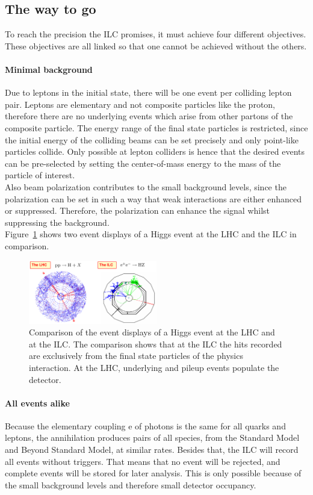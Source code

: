 \subsection{The way to go}
To reach the precision the ILC promises, it must achieve four different objectives.
These objectives are all linked so that one cannot be achieved without the others.

\paragraph{Minimal background}
Due to leptons in the initial state, there will be one event per colliding lepton pair.
Leptons are elementary and not composite particles like the proton, therefore there are no underlying events which arise from other partons of the composite particle.
The energy range of the final state particles is restricted, since the initial energy of the colliding beams can be set precisely and only point-like particles collide.
Only possible at lepton colliders is hence that the desired events can be pre-selected by setting the center-of-mass energy to the mass of the particle of interest.\\
Also beam polarization contributes to the small background levels, since the polarization can be set in such a way that weak interactions are either enhanced or suppressed.
Therefore, the polarization can enhance the signal whilst suppressing the background.\\
Figure~\ref{fig:Cleanliness} shows two event displays of a Higgs event at the LHC and the ILC in comparison.
\begin{figure}[H]
\centering
\includegraphics[width=0.5\textwidth]{Figures/Cleanliness.png}
\caption[Clean environment at the ILC]{Comparison of the event displays of a Higgs event at the  LHC and at the ILC.\cite[p. 4]{ILCPhysics_Thomson}
The comparison shows that at the ILC the hits recorded are exclusively from the final state particles of the physics interaction.
At the LHC, underlying and pileup events populate the detector.}
\label{fig:Cleanliness}
\end{figure}

\paragraph{All events alike}
Because the elementary coupling e of photons is the same for all quarks and leptons, the \electron \positron annihilation produces pairs of all species, from the Standard Model and Beyond Standard Model, at similar rates.
Besides that, the ILC will record all events without triggers.
That means that no event will be rejected, and complete events will be stored for later analysis.
This is only possible because of the small background levels and therefore small detector occupancy.

